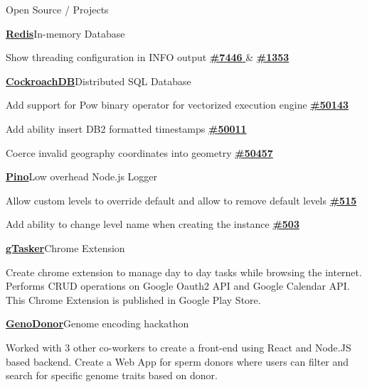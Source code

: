 \documentclass{resume}
\begin{document}
  \vspace{-0.5em}

  \begin{rSection}{Open Source / Projects}
    \begin{rProjectSection}{\href{https://github.com/redis/redis}{\textbf{Redis}}}{In-memory Database}
      \item Show threading configuration in INFO output \href{https://github.com/redis/redis/pull/7446}{ \textbf{\#7446} } \& \href{https://github.com/redis/redis-doc/pull/1353}{\textbf{\#1353}}
    \end{rProjectSection}
    \vspace{-1em}
    \begin{rProjectSection}{\href{https://github.com/cockroachdb/cockroach}{\textbf {CockroachDB}}}{Distributed SQL Database}
      \item Add support for Pow binary operator for vectorized execution engine \href{https://github.com/cockroachdb/cockroach/pull/50143}{\textbf{\#50143}}
      \item Add ability insert DB2 formatted timestamps \href{https://github.com/cockroachdb/cockroach/pull/50011}{\textbf{\#50011}}
      \item Coerce invalid geography coordinates into geometry \href{https://github.com/cockroachdb/cockroach/pull/50457}{\textbf{\#50457}}
    \end{rProjectSection}
    \vspace{-1em}
    \begin{rProjectSection}{\href{https://github.com/pinojs/pino}{\textbf{Pino}}}{Low overhead Node.js Logger}
      \item Allow custom levels to override default and allow to remove default levels \href{https://github.com/pinojs/pino/pull/515}{ \textbf{\#515} }
      \item Add ability to change level name when creating the instance \href{https://github.com/pinojs/pino/pull/503}{ \textbf{\#503} }
    \end{rProjectSection}
    \vspace{-1em}
    \begin{rProjectSection}{\href{https://chrome.google.com/webstore/detail/gtasker-extension/lljekoepijafpdebkahcjdhbjaappami?hl=en-GB}{\textbf{gTasker}}}{Chrome Extension}
      \item Create chrome extension to manage day to day tasks while browsing the internet. Performs CRUD operations on Google Oauth2 API and Google Calendar API. This Chrome Extension is published in Google Play Store.
    \end{rProjectSection}
    \vspace{-1em}
    \begin{rProjectSection}{\href{https://github.com/Arun4rangan/GenoDonor}{\textbf{GenoDonor}}}{Genome encoding hackathon}
      \item Worked with 3 other co-workers to create a front-end using React and Node.JS based backend. Create a Web App for sperm donors where users can filter and search for specific genome traits based on donor.
    \end{rProjectSection}
  \end{rSection}
  
\end{document}
